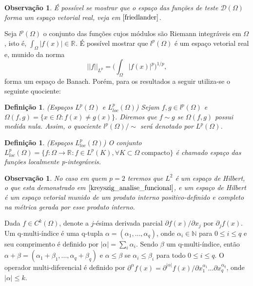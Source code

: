 \documentclass[12pt]{book}
\newtheorem{definicao}[teorema]{Definição}
\newtheorem{observacao}[teorema]{Observação}
\newcommand{\derivadaparcialabrev}[1]{\partial_{#1}}
\newcommand{\espacoLp}[1]{L^{p}(#1)}
\newcommand{\espacoLpcomp}[1]{L^{p}_{loc}(#1)}
\newcommand{\espacoLpGeral}[2]{L^{#1}(#2)}
\newcommand{\funcoesdiferenciaveis}[2]{C^{#1}(#2)}
\newcommand{\funcoesteste}{\mathcal{D}(\Omega)}
\newcommand{\normaLp}[1]{||#1||_{L^{p}}}
\newcommand{\normaLpdefinicao}[2]{ \Big(\int_{#2}#1^{p}\Big)^{1/p}}
\newcommand{\real}[1]{\mathbb{R}^{#1}}
\newcommand{\reta}{\real{}}
\begin{document}
	\begin{observacao}
		É possível se mostrar que o espaço das funções de teste $\funcoesteste$ forma um espaço vetorial real, veja em $\cite{friedlander}$.
	\end{observacao}
	
	Seja $l^{p}(\Omega)$ o conjunto das funções cujos módulos são Riemann integráveis em $\Omega$, isto é, $\int_{\Omega}|f(x)| \in \reta$. É possível mostrar que $l^{p}(\Omega)$ é um espaço vetorial real e, munido da norma
	$$
	\normaLp{f}=\normaLpdefinicao{|f(x)|}{\Omega},
	$$
	forma um espaço de Banach. Porém, para os resultados a seguir utiliza-se o seguinte quociente:
	
	\begin{definicao}\label{definicao_espaco_Lp}
		(Espaços $\espacoLpGeral{p}{\Omega}$ e $\espacoLpcomp{\Omega}$) Sejam $f,g \in l^{p}(\Omega)$ e $\Omega(f,g) = \{x\in \Omega: f(x) \neq g(x)\}$. Diremos que $f \sim g$ se $\Omega(f,g)$ possui medida nula. Assim, o quociente $l^{p}(\Omega)/\sim$ será denotado por $\espacoLpGeral{p}{\Omega}$.
	\end{definicao}
	
	\begin{definicao}
		(Espaços $\espacoLpcomp{\Omega}$) O conjunto $\espacoLpcomp{\Omega} = \{f:\Omega\to \reta: f \in \espacoLp{K}, \forall K \subset \Omega \;\text{compacto}\}$ é chamado espaço das funções localmente p-integráveis.
	\end{definicao}
	
	\begin{observacao}
		No caso em quem $p=2$ teremos que $L^{2}$ é um espaço de Hilbert, o que esta demonstrado em $\cite{kreyszig_analise_funcional}$, e um espaço de Hilbert é um espaço vetorial munido de um produto interno positivo-definido e completo na métrica gerada por esse produto interno.
	\end{observacao}
	
	Dada $f \in \funcoesdiferenciaveis{k}{\Omega}$, denote a $j$-ésima derivada parcial $\partial f(x)/\partial x_{j}$ por $\derivadaparcialabrev{j}f(x) $. Um q-multi-índice é uma q-tupla $\alpha = (\alpha_{1}, \dots, \alpha_{q})$, onde $\alpha_{i} \in \mathbb{N}$ para $0\leq i \leq q$ e seu comprimento é definido por $|\alpha| = \sum_{i}\alpha_{i}$. Sendo $\beta$ um q-multi-índice, então $\alpha+\beta=(\alpha_{1}+\beta_{1}, \dots, \alpha_{q}+\beta_{q})$ e $\alpha\leq \beta$ se $\alpha_{i}\leq\beta_{i}$ para todo $0\leq i \leq q$. O operador multi-diferencial é definido por $\partial^{\alpha} f(x) = \partial^{|\alpha|}f(x)/\partial{x^{\alpha_{1}}_{1}} \dots \partial{x^{\alpha_{q}}_{q}}$, onde $|\alpha|\leq k$.
	
\end{document}
